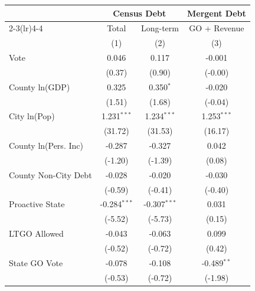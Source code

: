 \begingroup
\centering
\begin{tabular*}{\textwidth}{@{\extracolsep{\fill}}lccc}
   \toprule
                               & \multicolumn{2}{c}{Census Debt} & \multicolumn{1}{c}{Mergent Debt}\\  
   \cmidrule(lr){2-3}\cmidrule(lr){4-4}
                               & Total             & Long-term             & GO + Revenue \\   
                               & (1)               & (2)                   & (3)\\  
   \midrule 
   Vote                        & 0.046             & 0.117                 & -0.001\\   
                               & (0.37)           & (0.90)               & (-0.00)\\   
   County ln(GDP)              & 0.325             & 0.350$^{*}$           & -0.020\\   
                               & (1.51)           & (1.68)               & (-0.04)\\   
   City ln(Pop)                & 1.231$^{***}$     & 1.234$^{***}$         & 1.253$^{***}$\\   
                               & (31.72)          & (31.53)              & (16.17)\\   
   County ln(Pers. Inc)        & -0.287            & -0.327                & 0.042\\   
                               & (-1.20)          & (-1.39)              & (0.08)\\   
   County Non-City Debt        & -0.028            & -0.020                & -0.030\\   
                               & (-0.59)          & (-0.41)              & (-0.40)\\   
   Proactive State             & -0.284$^{***}$    & -0.307$^{***}$        & 0.031\\   
                               & (-5.52)          & (-5.73)              & (0.15)\\   
   LTGO Allowed                & -0.043            & -0.063                & 0.099\\   
                               & (-0.52)          & (-0.72)              & (0.42)\\   
   State GO Vote               & -0.078            & -0.108                & -0.489$^{**}$\\   
                               & (-0.53)          & (-0.72)              & (-1.98)\\   

\end{tabular*}
